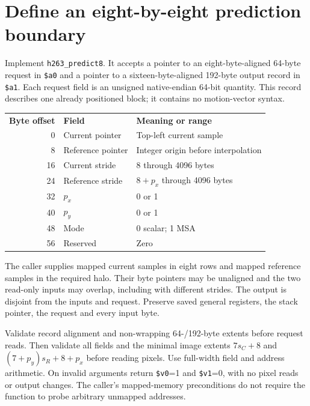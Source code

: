 \section{Define an eight-by-eight prediction boundary}
Implement \texttt{h263\_predict8}. It accepts a pointer to an eight-byte-aligned
64-byte request in \texttt{\$a0} and a pointer to a sixteen-byte-aligned 192-byte
output record in \texttt{\$a1}. Each request field is an unsigned native-endian
64-bit quantity. This record describes one already positioned block; it contains
no motion-vector syntax.
\begin{center}
  \begin{tabular}{rll}
    \textbf{Byte offset} & \textbf{Field}    & \textbf{Meaning or range}           \\
    0                    & Current pointer   & Top-left current sample             \\
    8                    & Reference pointer & Integer origin before interpolation \\
    16                   & Current stride    & 8 through 4096 bytes                \\
    24                   & Reference stride  & $8+p_x$ through 4096 bytes          \\
    32                   & $p_x$             & 0 or 1                              \\
    40                   & $p_y$             & 0 or 1                              \\
    48                   & Mode              & 0 scalar; 1 MSA                     \\
    56                   & Reserved          & Zero
  \end{tabular}
\end{center}
The caller supplies mapped current samples in eight rows and mapped reference
samples in the required halo. Their byte pointers may be unaligned and the two
read-only inputs may overlap, including with different strides. The output is
disjoint from the inputs and request. Preserve saved general registers, the stack
pointer, the request and every input byte.

Validate record alignment and non-wrapping 64-/192-byte extents before request
reads. Then validate all fields and the minimal image extents
$7s_C+8$ and $(7+p_y)s_R+8+p_x$ before reading pixels. Use full-width field and
address arithmetic. On invalid arguments return \texttt{\$v0}=1 and
\texttt{\$v1}=0, with no pixel reads or output changes. The caller's mapped-memory
preconditions do not require the function to probe arbitrary unmapped addresses.

